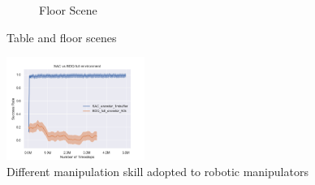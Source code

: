 \begin{figure}[!htbp]
\begin{subfigure}{0.49\textwidth}
        \caption{Floor Scene} \label{fig:floor}
    \end{subfigure}%
    \hspace*{\fill}   %


\caption{ Table and floor scenes \label{fig:scenes}}
\end{figure}

\begin{figure}[!htbp]
    \centering
        \includegraphics[width=0.4\textwidth]{figures/SACfull/SAC_vs_BDQ_full_environment}
    \caption{Different manipulation skill adopted to robotic manipulators \cite{Kroemer2019}}
    \label{fig:x manipulation_skills}
\end{figure}
